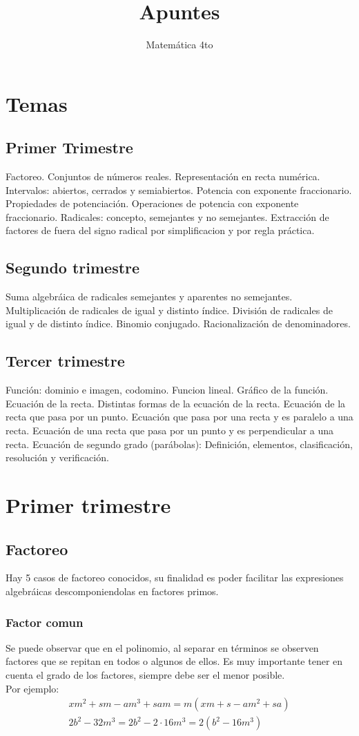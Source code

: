 \documentclass[a4paper]{article}
\title{Apuntes}
\author{Matemática 4to}
\begin{document}
\maketitle
\section{Temas}
\subsection{Primer Trimestre}
Factoreo. Conjuntos de números reales. Representación en recta numérica. Intervalos: abiertos, cerrados y semiabiertos. Potencia con exponente fraccionario. Propiedades de potenciación. Operaciones de potencia con exponente fraccionario. Radicales: concepto, semejantes y no semejantes. Extracción de factores de fuera del signo radical por simplificacion y por regla práctica.
\subsection{Segundo trimestre}
Suma algebráica de radicales semejantes y aparentes no semejantes. Multiplicación de radicales de igual y distinto índice. División de radicales de igual y de distinto índice. Binomio conjugado. Racionalización de denominadores.
\subsection{Tercer trimestre}
Función: dominio e imagen, codomino. Funcion lineal. Gráfico de la función. Ecuación de la recta. Distintas formas de la ecuación de la recta. Ecuación de la recta que pasa por un punto. Ecuación que pasa por una recta y es paralelo a una recta. Ecuación de una recta que pasa por un punto y es perpendicular a una recta. Ecuación de segundo grado (parábolas): Definición, elementos, clasificación, resolución y verificación.

\section{Primer trimestre}
\subsection{Factoreo}
Hay 5 casos de factoreo conocidos, su finalidad es poder facilitar las expresiones algebráicas descomponiendolas en factores primos.
\subsubsection{Factor comun}
Se puede observar que en el polinomio, al separar en términos se observen factores que se repitan en todos o algunos de ellos. Es muy importante tener en cuenta el grado de los factores, siempre debe ser el menor posible.\\
Por ejemplo:
\begin{gather*}
    xm^2 + sm - am^3 + sam = m(xm+s-am^2+sa)\\
    2b^2-32m^3=2b^2-2\cdot 16m^3=2(b^2-16m^3)
\end{gather*}
\end{document}
